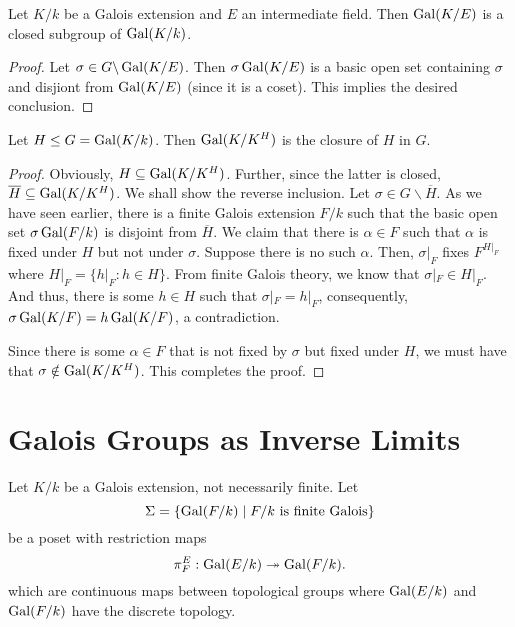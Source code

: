 \begin{proposition}
    Let $K/k$ be a Galois extension and $E$ an intermediate field. Then $\operatorname{Gal}(K/E)$ is a closed subgroup of $\operatorname{Gal}(K/k)$.
\end{proposition}
\begin{proof}
    Let $\sigma\in G\backslash\operatorname{Gal}(K/E)$. Then $\sigma\operatorname{Gal}(K/E)$ is a basic open set containing $\sigma$ and disjiont from $\operatorname{Gal}(K/E)$ (since it is a coset). This implies the desired conclusion.
\end{proof}

\begin{proposition}
    Let $H\le G = \operatorname{Gal}(K/k)$. Then $\operatorname{Gal}(K/K^H)$ is the closure of $H$ in $G$.
\end{proposition}
\begin{proof}
    Obviously, $H\subseteq\operatorname{Gal}(K/K^H)$. Further, since the latter is closed, $\overline{H}\subseteq\operatorname{Gal}(K/K^H)$. We shall show the reverse inclusion. Let $\sigma\in G\backslash\overline H$. As we have seen earlier, there is a finite Galois extension $F/k$ such that the basic open set $\sigma\operatorname{Gal}(F/k)$ is disjoint from $\overline H$. We claim that there is $\alpha\in F$ such that $\alpha$ is fixed under $H$ but not under $\sigma$. Suppose there is no such $\alpha$. Then, $\sigma|_F$ fixes $F^{H\vert_F}$ where $H\vert_F = \{h\vert_F : h\in H\}$. From finite Galois theory, we know that $\sigma|_F\in H|_F$. And thus, there is some $h\in H$ such that $\sigma|_F = h|_F$, consequently, $\sigma\operatorname{Gal}(K/F) = h\operatorname{Gal}(K/F)$, a contradiction. 

    Since there is some $\alpha\in F$ that is not fixed by $\sigma$ but fixed under $H$, we must have that $\sigma\notin\operatorname{Gal}(K/K^H)$. This completes the proof.
\end{proof}

\section{Galois Groups as Inverse Limits}

Let $K/k$ be a Galois extension, not necessarily finite. Let 
\begin{equation*}
    \Sigma = \left\{\operatorname{Gal}(F/k)\mid F/k\text{ is finite Galois}\right\}
\end{equation*}
be a poset with restriction maps
\begin{equation*}
    \pi^E_F:\operatorname{Gal}(E/k)\twoheadrightarrow\operatorname{Gal}(F/k).
\end{equation*}
which are continuous maps between topological groups where $\operatorname{Gal}(E/k)$ and $\operatorname{Gal}(F/k)$ have the discrete topology.

